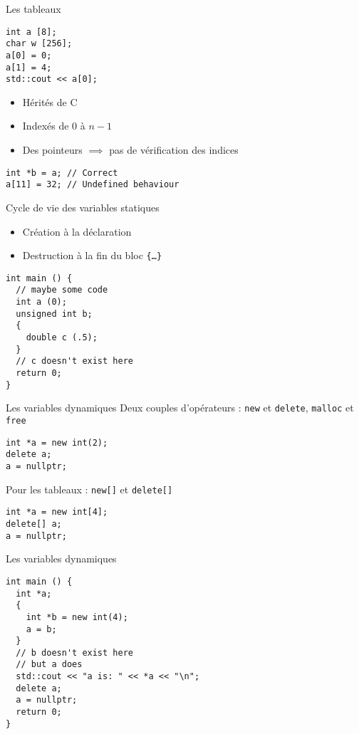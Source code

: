 \begin{frame}[fragile]{Les tableaux}
  \begin{lstlisting}
int a [8];
char w [256];
a[0] = 0;
a[1] = 4;
std::cout << a[0];
  \end{lstlisting}

  \begin{itemize}
  \item Hérités de C
  \item Indexés de 0 à $n-1$
  \item Des pointeurs $\implies$ pas de vérification des indices
  \end{itemize}

  \begin{lstlisting}
int *b = a; // Correct
a[11] = 32; // Undefined behaviour
  \end{lstlisting}  
\end{frame}

\begin{frame}[fragile]{Cycle de vie des variables statiques}
  \begin{itemize}
  \item Création à la déclaration
  \item Destruction à la fin du bloc \texttt{\{\dots\}}
  \end{itemize}

  \begin{lstlisting}
int main () {
  // maybe some code
  int a (0);
  unsigned int b;
  {
    double c (.5);
  }
  // c doesn't exist here
  return 0;
}
  \end{lstlisting}
\end{frame}

\begin{frame}[fragile]{Les variables dynamiques}
  Deux couples d'opérateurs : \texttt{new} et \texttt{delete}, \texttt{malloc} et \texttt{free}
  \begin{lstlisting}
int *a = new int(2);
delete a;
a = nullptr;
  \end{lstlisting}

  Pour les tableaux : \texttt{new[]} et \texttt{delete[]}
  \begin{lstlisting}
int *a = new int[4];
delete[] a;
a = nullptr;
  \end{lstlisting}
\end{frame}

\begin{frame}[fragile]{Les variables dynamiques}
  \begin{lstlisting}
int main () {
  int *a;
  {
    int *b = new int(4);
    a = b;
  }
  // b doesn't exist here
  // but a does
  std::cout << "a is: " << *a << "\n";
  delete a;
  a = nullptr;
  return 0;
}
  \end{lstlisting}
\end{frame}

